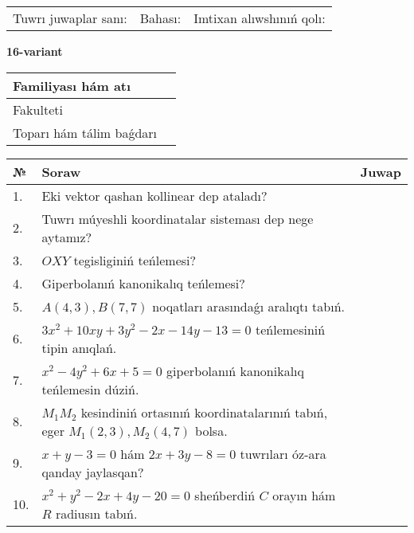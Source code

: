 \documentclass{article}
\begin{document}
\vspace{1cm}

\begin{tabular}{lll}
Tuwrı juwaplar sanı: \underline{\hspace{1.5cm}} & 
Bahası: \underline{\hspace{1.5cm}} & 
Imtixan alıwshınıń qolı: \underline{\hspace{2cm}} \\
\end{tabular}

\egroup

\newpage


\textbf{16-variant}\\

\bgroup
\def\arraystretch{1.6} %

\begin{tabular}{|m{5.7cm}|m{9.5cm}|}
\hline
Familiyası hám atı & \\
\hline
Fakulteti  & \\
\hline
Toparı hám tálim baǵdarı  & \\
\hline
\end{tabular}

\vspace{1cm}

\begin{tabular}{|m{0.7cm}|m{10cm}|m{4cm}|}
\hline
№ & Soraw & Juwap \\
\hline
1. & Eki vektor qashan kollinear dep ataladı? &  \\
\hline
2. & Tuwrı múyeshli koordinatalar sisteması dep nege aytamız? &  \\
\hline
3. & $OXY$ tegisliginiń teńlemesi? &  \\
\hline
4. & Giperbolanıń kanonikalıq teńlemesi? &  \\
\hline
5. & $A(4, 3), B(7, 7)$ noqatları arasındaǵı aralıqtı tabıń. &  \\
\hline
6. & $3x^{2}+10xy+3y^{2}-2x-14y-13=0$ teńlemesiniń tipin anıqlań. &  \\
\hline
7. & $x^{2}-4y^{2}+6x+5=0$ giperbolanıń kanonikalıq teńlemesin dúziń. &  \\
\hline
8. & $M_{1}M_{2}$ kesindiniń ortasınıń koordinatalarınıń tabıń, eger $M_{1} (2, 3), M_{2} (4, 7)$ bolsa. &  \\
\hline
9. & $x+y-3=0$ hám $2x+3y-8=0$ tuwrıları óz-ara qanday jaylasqan? &  \\
\hline
10. & $x^{2}+y^{2}-2x+4y-20=0$ sheńberdiń $C$ orayın hám $R$ radiusın tabıń. &  \\
\hline
\end{tabular}
\end{document}
